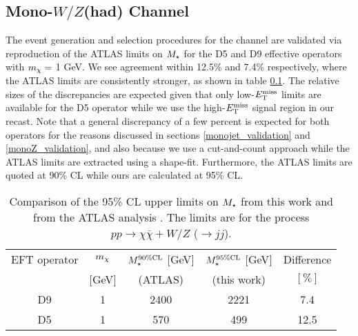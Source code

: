 \subsection{Mono-$W/Z$(had) Channel}
\label{monoWZ_validation}

The event generation and selection procedures for the \monoWZ channel are validated via reproduction of the ATLAS limits on $M_{\star}$ for the D5 and D9 effective operators with $m_{\chi} = $ 1 GeV. We see agreement within 12.5\% and 7.4\% respectively, where the ATLAS limits are consistently stronger, as shown in table \ref{monoWZ_validation}. The relative sizes of the discrepancies are expected given that only low-$E_{\mathrm{T}}^{\mathrm{miss}}$ limits are available for the D5 operator while we use the high-$E_{\mathrm{T}}^{\mathrm{miss}}$ signal region in our recast. Note that a general discrepancy of a few percent is expected for both operators for the reasons discussed in sections \ref{monojet_validation} and \ref{monoZ_validation}, and also because we use a cut-and-count approach while the ATLAS limits are extracted using a shape-fit. Furthermore, the ATLAS limits are quoted at 90\% CL while ours are calculated at 95\% CL.

\begin{table}[!h]
\begin{center}
\begin{tabular}{ c | c | c | c | c }
\hline
\hline
EFT operator & $m_{\chi}$ & $M_{\star}^{90\%\mathrm{CL}}$ $[$GeV$]$ & $M_{\star}^{95\%\mathrm{CL}}$ $[$GeV$]$  & Difference \T \\
&$[$GeV$]$ & (ATLAS) & (this work) & $[\%]$ \B \\
\hline
D9 & 1 & 2400 & 2221 & 7.4 \\
D5 & 1 & 570 & 499 & 12.5 \\
\hline
\hline
\end{tabular}
\end{center}
\caption{Comparison of the 95\% CL upper limits on $M_{\star}$ from this work and from the ATLAS \monoWZ analysis \cite{Aad:2013monoWZ}. The limits are for the process $pp \rightarrow \chi \bar{\chi} + W/Z$ ($\rightarrow jj$).}
\label{tab:monoWZvalidation}
\end{table}
